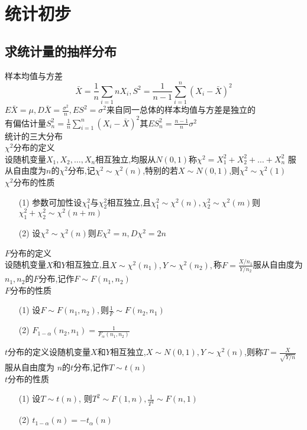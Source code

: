 \documentclass[12pt, a4paper, oneside, UTF8]{ctexbook}
\begin{document}
% 
\else
\fi

\chapter{统计初步}

\section{求统计量的抽样分布}
\begin{remark}
    样本均值与方差
    \[
    \bar{X}=\frac{1}{n}\sum_{i=1}{n}X_i, S^2=\frac{1}{n-1}\sum_{i=1}^{n}(X_i-\bar{X})^2
    \]
    $E\bar{X}=\mu,D\bar{X}=\frac{\sigma^2}{n},ES^2=\sigma^2${\color{red}来自同一总体的样本均值与方差是独立的} \\
    有偏估计量$S_{n}^{2}=\frac{1}{n}\sum_{i=1}^{n}(X_i-\bar{X})^2$其$ES_{n}^{2}=\frac{n-1}{n}\sigma^2$ \\
    统计的三大分布 \\
    $\chi^2$分布的定义\\ 
    设随机变量$X_1,X_2,\ldots,X_n$相互独立,均服从$N(0,1)$称$\chi^2=X_1^2+X_2^2+\ldots+X_n^2$
    服从自由度为$n$的$\chi^2$分布,记$\chi^2\sim\chi^2(n)$,特别的若$X\sim N(0,1)$,则$\chi^2\sim\chi^2(1)$ \\
    $\chi^2$分布的性质
    \begin{enumerate}
    \item[(1)] 参数可加性\qquad 设$\chi_1^2$与$\chi_2^2$相互独立,且$\chi_1^2\sim\chi^2(n),\chi_2^2\sim\chi^2(m)$则
    $\chi_1^2+\chi_2^2\sim\chi^2(n+m)$
    \item[(2)] 设$\chi^2\sim\chi^2(n)$则$E\chi^2=n,D\chi^2=2n$
    \end{enumerate}
    $F$分布的定义 \\
    设随机变量$X$和$Y$相互独立,且$X\sim \chi^2(n_1),Y\sim\chi^2(n_2),$称$F=\frac{X/n_1}{Y/n_2}$服从自由度为
    $n_1,n_2$的$F$分布,记作$F\sim F(n_1,n_2)$\\
    $F$分布的性质 
    \begin{enumerate}
    \item[(1)] 设$F\sim F(n_1,n_2),$则$\frac{1}{F}\sim F(n_2,n_1)$
    \item[(2)] $F_{1-\alpha}(n_2,n_1)=\frac{1}{F_{\alpha}(n_1,n_2)}$
    \end{enumerate}
    $t$分布的定义\qquad 设随机变量$X$和$Y$相互独立,$X\sim N(0,1),Y\sim \chi^2(n)$,则称$T=\frac{X}{\sqrt{Y/n}}$服从自由度为
    $n$的$t$分布,记作$T\sim t(n)$ \\
    $t$分布的性质 
    \begin{enumerate}
    \item[(1)] 设$T\sim t(n)$, 则$T^2\sim F(1, n),\frac{1}{T^2}\sim F(n,1)$ 
    \item[(2)] $t_{1-\alpha}(n)=-t_{\alpha}(n)$ 
    \end{enumerate}
\end{remark}
\end{document}
